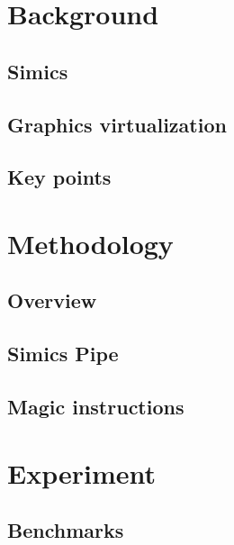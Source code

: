 \documentclass{beamer}
\begin{document}
	

	\section{Background}
	\subsection{Simics}
	
	\subsection{Graphics virtualization}
	

	\subsection{Key points}
	

	\section{Methodology}
	\subsection{Overview}
	
	\subsection{Simics Pipe}
	
	\subsection{Magic instructions}

	\section{Experiment}
	\subsection{Benchmarks}
	

\end{document}

